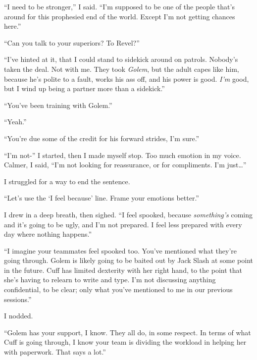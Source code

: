 ``I need to be stronger,'' I said.  ``I'm supposed to be one of the people that's around for this prophesied end of the world.  Except I'm not getting chances here.''



``Can you talk to your superiors?  To Revel?''



``I've hinted at it, that I could stand to sidekick around on patrols.  Nobody's taken the deal.  Not with me.  They took \emph{Golem}, but the adult capes like him, because he's polite to a fault, works his ass off, and his power is good.  \emph{I'm} good, but I wind up being a partner more than a sidekick.''



``You've been training with Golem.''



``Yeah.''



``You're due some of the credit for his forward strides, I'm sure.''



``I'm not-'' I started, then I made myself stop.  Too much emotion in my voice.  Calmer, I said, ``I'm not looking for reassurance, or for compliments.  I'm just\ldots''



I struggled for a way to end the sentence.



``Let's use the `I feel because' line.  Frame your emotions better.''



I drew in a deep breath, then sighed.  ``I feel spooked, because \emph{something's} coming and it's going to be ugly, and I'm not prepared.  I feel less prepared with every day where nothing happens.''



``I imagine your teammates feel spooked too.  You've mentioned what they're going through.  Golem is likely going to be baited out by Jack Slash at some point in the future.  Cuff has limited dexterity with her right hand, to the point that she's having to relearn to write and type.  I'm not discussing anything confidential, to be clear; only what you've mentioned to me in our previous sessions.''



I nodded.



``Golem has your support, I know.  They all do, in some respect.  In terms of what Cuff is going through, I know your team is dividing the workload in helping her with paperwork.  That says a lot.''




